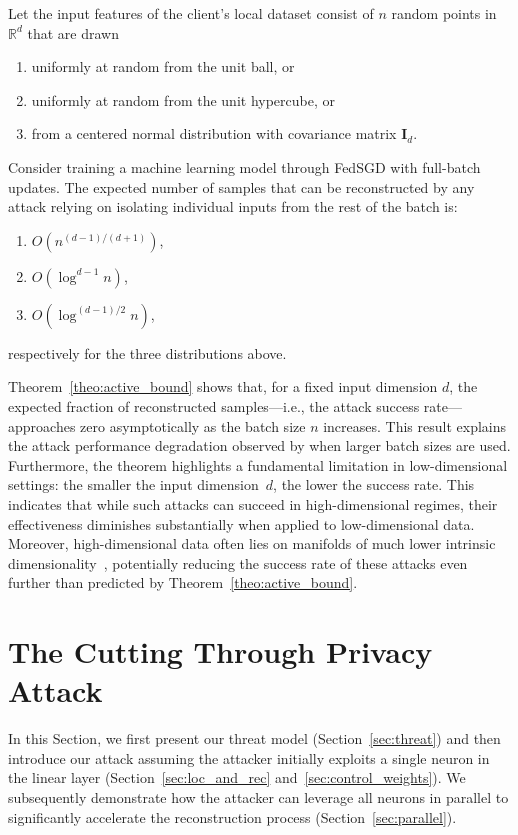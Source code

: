 \begin{theorem}
\label{theo:active_bound}
Let the input features of the client's local dataset consist of $n$ random points in $\mathbb{R}^d$ that are drawn
\begin{enumerate}
    \item uniformly at random from the unit ball, or
    \item uniformly at random from the unit hypercube, or
    \item from a centered normal distribution with covariance matrix $\mathbf{I}_d$.
\end{enumerate}
Consider training a machine learning model through FedSGD with full-batch updates. The expected number of samples that can be reconstructed by any attack relying on isolating individual inputs from the rest of the batch is:
\begin{enumerate}
    \item $O(n^{(d-1)/(d+1)})$, %
    \item $O(\log^{d-1} n)$, %
    \item $O(\log^{(d-1)/2} n)$,
\end{enumerate}
respectively for the three distributions above.
\end{theorem}

Theorem~\ref{theo:active_bound} shows that, for a fixed input dimension $d$, the expected fraction of reconstructed samples---i.e., the attack success rate---approaches zero asymptotically as the batch size $n$ increases. This result explains the attack performance degradation observed by \cite{boenischWhenCuriousAbandon2023, ZHANG2023119421} when larger batch sizes are used.
Furthermore, the theorem highlights a fundamental limitation in low-dimensional settings: the smaller the input dimension~$d$, the lower the success rate. 
This indicates that while such attacks can succeed in high-dimensional regimes, their effectiveness diminishes substantially when applied to low-dimensional data. Moreover, high-dimensional data often lies on manifolds of much lower intrinsic dimensionality~\cite{NIPS2010_8a1e808b, pope2021the, brown2023verifying}, potentially reducing the success rate of these attacks even further than predicted by Theorem~\ref{theo:active_bound}.

\section{The Cutting Through Privacy Attack} \label{sec:our_attack}
In this Section, we first present our threat model (Section~\ref{sec:threat}) and then introduce our attack assuming the attacker initially exploits a single neuron in the linear layer (Section~\ref{sec:loc_and_rec} and~\ref{sec:control_weights}). We subsequently demonstrate how the attacker can leverage all neurons in parallel to significantly accelerate the reconstruction process (Section~\ref{sec:parallel}).

